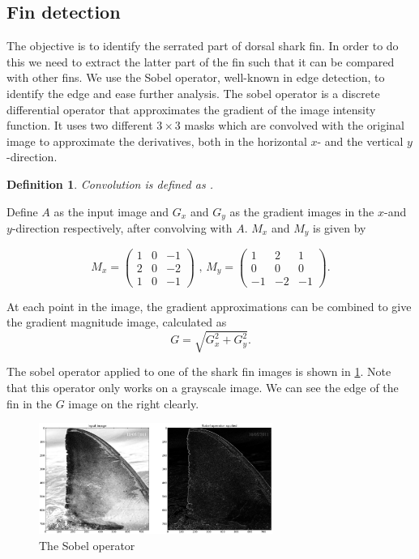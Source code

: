 \documentclass[a4paper,10pt]{article}
\newtheorem{mydef}{Definition}
\begin{document}
\subsection{Fin detection}
The objective is to identify the serrated part of dorsal shark fin. In order to do this we need to extract the latter part of the fin such that it can be
compared with other fins.  We use the Sobel operator, well-known in edge detection, to identify the edge and ease further analysis.  
The sobel operator is a discrete differential operator that approximates the gradient of the image intensity function.
It uses two different $3 \times 3$ masks which are convolved with the original image to approximate the derivatives, both in the horizontal $x$-
and the vertical $y$-direction.  

\begin{mydef}
Convolution is defined as .


\end{mydef}

Define $A$ as the input image and $G_x$ and $G_y$ as the gradient images in the $x$-and $y$-direction respectively,
after convolving with $A$.  $M_x$ and $M_y$ is given by

\[
 M_x = \begin{pmatrix*}
        1 & 0 & -1 \\
        2 & 0 & -2 \\
        1 & 0 & -1
       \end{pmatrix*}
\mbox{ , }
 M_y = \begin{pmatrix*}
        1 & 2 & 1 \\
        0 & 0 & 0 \\
        -1 & -2 & -1
       \end{pmatrix*}
.\]

At each point in the image, the gradient approximations can be combined to give the gradient magnitude image, calculated  as
\[
 G = \sqrt{G_x^2+G_y^2}
.\]

The sobel operator applied to one of the shark fin images is shown in \ref{sobel}.  Note that this operator only works on a grayscale image.
We can see the edge of the fin in the $G$ image on the right clearly.

\begin{figure}[H]
 \centering
 \includegraphics[width=3in]{sobel.jpg}
 \caption{The Sobel operator}
 \label{sobel}
\end{figure}
\end{document}
